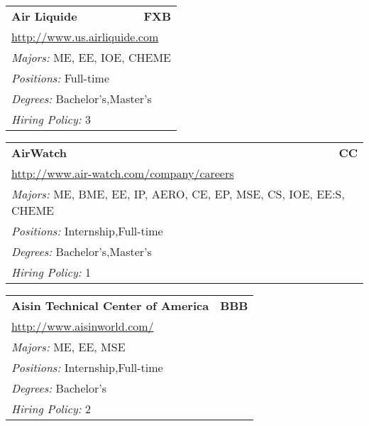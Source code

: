 \documentclass[twoside]{article}
\begin{document}
\begin{center}
\begin{multicols}{3}
\begin{FlushLeft}
\begin{minipage}{\columnwidth}
\end{minipage}
 
\begin{minipage}{\columnwidth}\begin{tabularx}{.95\columnwidth}{Xr}
                 {\Large\bf Air Liquide} & {\Large\bf FXB}\\
    \multicolumn{2}{p{.95\columnwidth}}{\url{http://www.us.airliquide.com}}\\
    \multicolumn{2}{p{.95\columnwidth}}{\emph{Majors:} ME, EE, IOE, CHEME}\\
    \multicolumn{2}{p{.95\columnwidth}}{\emph{Positions:} Full-time}\\
    \multicolumn{2}{p{.95\columnwidth}}{\emph{Degrees:} Bachelor's,Master's}\\
    \multicolumn{2}{p{.95\columnwidth}}{\emph{Hiring Policy:} 3}\\
    \end{tabularx}
    
\end{minipage}
 
\begin{minipage}{\columnwidth}\begin{tabularx}{.95\columnwidth}{Xr}
                 {\Large\bf AirWatch} & {\Large\bf CC}\\
    \multicolumn{2}{p{.95\columnwidth}}{\url{http://www.air-watch.com/company/careers}}\\
    \multicolumn{2}{p{.95\columnwidth}}{\emph{Majors:} ME, BME, EE, IP, AERO, CE, EP, MSE, CS, IOE, EE:S, CHEME}\\
    \multicolumn{2}{p{.95\columnwidth}}{\emph{Positions:} Internship,Full-time}\\
    \multicolumn{2}{p{.95\columnwidth}}{\emph{Degrees:} Bachelor's,Master's}\\
    \multicolumn{2}{p{.95\columnwidth}}{\emph{Hiring Policy:} 1}\\
    \end{tabularx}
    
\end{minipage}
 
\begin{minipage}{\columnwidth}\begin{tabularx}{.95\columnwidth}{Xr}
                 {\Large\bf Aisin Technical Center of America} & {\Large\bf BBB}\\
    \multicolumn{2}{p{.95\columnwidth}}{\url{http://www.aisinworld.com/}}\\
    \multicolumn{2}{p{.95\columnwidth}}{\emph{Majors:} ME, EE, MSE}\\
    \multicolumn{2}{p{.95\columnwidth}}{\emph{Positions:} Internship,Full-time}\\
    \multicolumn{2}{p{.95\columnwidth}}{\emph{Degrees:} Bachelor's}\\
    \multicolumn{2}{p{.95\columnwidth}}{\emph{Hiring Policy:} 2}\\
    \end{tabularx}
    

\end{minipage}
\end{FlushLeft}
\end{multicols}
\end{center}
\end{document}
